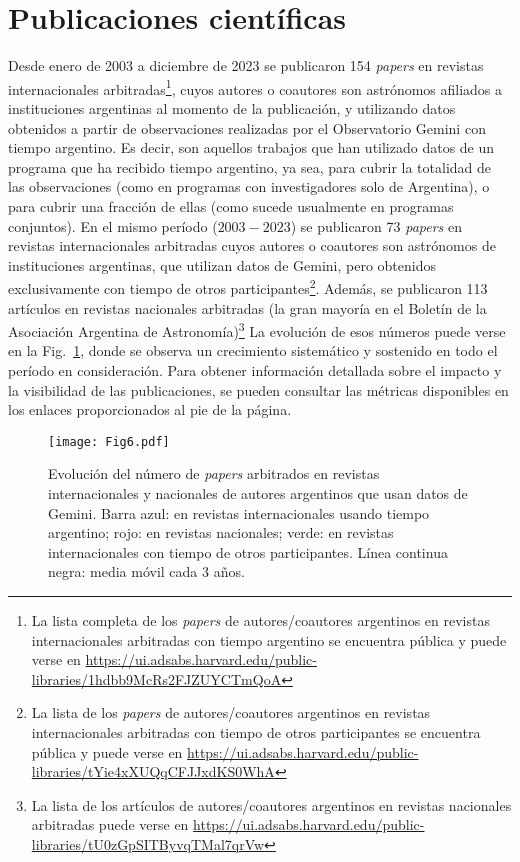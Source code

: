 \documentclass[baaa]{baaa}
\begin{document}
\section{Publicaciones científicas}
Desde enero de 2003 a diciembre de 2023 se publicaron 154 {\em papers} en revistas internacionales arbitradas\footnote{La lista completa de los {\em papers} de autores/coautores argentinos en revistas internacionales arbitradas con tiempo argentino se encuentra pública y puede verse en \url{https://ui.adsabs.harvard.edu/public-libraries/1hdbb9McRs2FJZUYCTmQoA}}, cuyos autores o coautores son astrónomos afiliados a instituciones argentinas al momento de la publicación, y utilizando datos obtenidos a partir de observaciones realizadas por el Observatorio Gemini con tiempo argentino. 
Es decir, son aquellos trabajos que han utilizado datos de un programa que ha recibido tiempo argentino, ya sea, para cubrir la totalidad de las observaciones (como en programas con investigadores solo de Argentina), o para cubrir una fracción de ellas (como sucede usualmente en programas conjuntos).
En el mismo período ($2003 - 2023$) se publicaron 73 {\em papers} en revistas internacionales arbitradas cuyos autores o coautores son astrónomos de instituciones argentinas, que utilizan datos de Gemini, pero obtenidos exclusivamente con tiempo de otros participantes\footnote{La lista de los {\em papers} de autores/coautores argentinos en revistas internacionales arbitradas con tiempo de otros participantes se encuentra pública y puede verse en \url{https://ui.adsabs.harvard.edu/public-libraries/tYie4xXUQqCFJJxdKS0WhA}}. 
Además, se publicaron 113 artículos en revistas nacionales arbitradas (la gran mayoría en el Boletín de la Asociación Argentina de Astronomía)\footnote{La lista de los artículos de autores/coautores argentinos en revistas nacionales arbitradas puede verse en \url{https://ui.adsabs.harvard.edu/public-libraries/tU0zGpSITByvqTMal7qrVw}}
La evolución de esos números puede verse en la Fig.~\ref{fig6}, donde se observa un crecimiento sistemático y sostenido en todo el período en consideración. 
Para obtener información detallada sobre el impacto y la visibilidad de las publicaciones, se pueden consultar las métricas disponibles en los enlaces proporcionados al pie de la página.
\\

\begin{figure}[!t]
\centering
\texttt{[image: Fig6.pdf]}
\caption{Evolución del número de {\em papers} arbitrados en revistas internacionales y nacionales de autores argentinos que usan datos de Gemini. Barra azul: en revistas internacionales usando tiempo argentino; rojo: en revistas nacionales; verde: en revistas internacionales con tiempo de otros participantes. Línea continua negra: media móvil cada 3 años.}
\label{fig6}
\end{figure}
\end{document}
